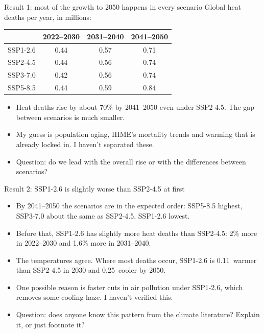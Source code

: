 \documentclass[aspectratio=169,11pt]{beamer}
\begin{document}
\begin{frame}{Result 1: most of the growth to 2050 happens in every scenario}
  \small
  Global heat deaths per year, in millions:

  \medskip
  \centering
  \begin{tabular}{lccc}
    \toprule
    & 2022--2030 & 2031--2040 & 2041--2050 \\
    \midrule
    SSP1-2.6 & 0.44 & 0.57 & 0.71 \\
    SSP2-4.5 & 0.44 & 0.56 & 0.74 \\
    SSP3-7.0 & 0.42 & 0.56 & 0.74 \\
    SSP5-8.5 & 0.44 & 0.59 & 0.84 \\
    \bottomrule
  \end{tabular}

  \medskip
  \raggedright
  \begin{itemize}
    \item Heat deaths rise by about 70\% by 2041--2050 even under SSP2-4.5.
      The gap between scenarios is much smaller.
    \item My guess is population aging, IHME's mortality trends and warming
      that is already locked in. I haven't separated these.
    \item Question: do we lead with the overall rise or with the differences
      between scenarios?
  \end{itemize}
\end{frame}

\begin{frame}{Result 2: SSP1-2.6 is slightly worse than SSP2-4.5 at first}
  \begin{itemize}
    \item By 2041--2050 the scenarios are in the expected order: SSP5-8.5
      highest, SSP3-7.0 about the same as SSP2-4.5, SSP1-2.6 lowest.
    \item Before that, SSP1-2.6 has slightly more heat deaths than SSP2-4.5:
      2\% more in 2022--2030 and 1.6\% more in 2031--2040.
    \item The temperatures agree. Where most deaths occur, SSP1-2.6 is
      0.11\,\textcelsius{} warmer than SSP2-4.5 in 2030 and
      0.25\,\textcelsius{} cooler by 2050.
    \item One possible reason is faster cuts in air pollution under SSP1-2.6,
      which removes some cooling haze. I haven't verified this.
    \item Question: does anyone know this pattern from the climate
      literature? Explain it, or just footnote it?
  \end{itemize}
\end{frame}
\end{document}

